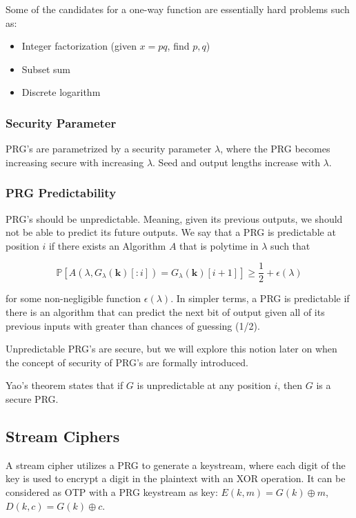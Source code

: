 \documentclass{article}
\begin{document}
\begin{multicols}{2}
Some of the candidates for a one-way function are essentially hard problems such as:

\begin{itemize}
    \item Integer factorization (given $x = pq$, find $p,q$) 
    \item Subset sum
    \item Discrete logarithm
\end{itemize}

\subsubsection {Security Parameter}

PRG's are parametrized by a security parameter $\lambda$, where the PRG becomes increasing secure with increasing $\lambda$. Seed and output lengths increase with $\lambda$.

\subsubsection {PRG Predictability}

PRG's should be unpredictable. Meaning, given its previous outputs, we should not be able to predict its future outputs. We say that a PRG is predictable at position $i$ if there exists an Algorithm $A$ that is polytime in $\lambda$ such that

$$
\mathbb{P}[A(\lambda, G_\lambda(\mathbf{k})[:i]) = G_\lambda(\mathbf{k})[i+1]] \geq \frac{1}{2} + \epsilon(\lambda)
$$

for some non-negligible function $\epsilon(\lambda)$. In simpler terms, a PRG is predictable if there is an algorithm that can predict the next bit of output given all of its previous inputs with greater than chances of guessing (1/2).

Unpredictable PRG's are secure, but we will explore this notion later on when the concept of security of PRG's are formally introduced.

Yao's theorem states that if $G$ is unpredictable at any position $i$, then $G$ is a secure PRG.

\subsection {Stream Ciphers}

A stream cipher utilizes a PRG to generate a keystream, where each digit of the key is used to encrypt a digit in the plaintext with an XOR operation. It can be considered as OTP with a PRG keystream as key: $E(k,m) = G(k) \oplus m$, $D(k,c) = G(k) \oplus c$. 


\end{multicols}
\end{document}

